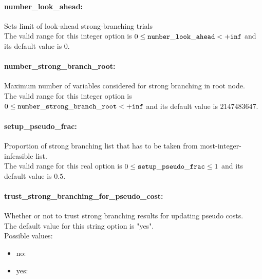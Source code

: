 \paragraph{number\_look\_ahead:}\label{sec:number_look_ahead} Sets limit of look-ahead strong-branching trials $\;$ \\
 The valid range for this integer option is
$0 \le {\tt number\_look\_ahead } <  {\tt +inf}$
and its default value is $0$.


\paragraph{number\_strong\_branch\_root:}\label{sec:number_strong_branch_root} Maximum number of variables considered for strong branching in root node. $\;$ \\
 The valid range for this integer option is
$0 \le {\tt number\_strong\_branch\_root } <  {\tt +inf}$
and its default value is $2147483647$.


\paragraph{setup\_pseudo\_frac:}\label{sec:setup_pseudo_frac} Proportion of strong branching list that has to be taken from most-integer-infeasible list. $\;$ \\
 The valid range for this real option is 
$0 \le {\tt setup\_pseudo\_frac } \le 1$
and its default value is $0.5$.


\paragraph{trust\_strong\_branching\_for\_pseudo\_cost:}\label{sec:trust_strong_branching_for_pseudo_cost} Whether or not to trust strong branching results for updating pseudo costs. $\;$ \\

The default value for this string option is "yes".
\\ 
Possible values:
\begin{itemize}
   \item no: 
   \item yes: 
\end{itemize}

